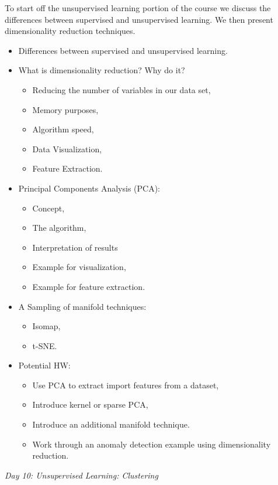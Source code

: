 \documentclass[12pt]{article}
\begin{document}
	\noindent
	To start off the unsupervised learning portion of the course we discuss the differences between supervised and unsupervised learning. We then present dimensionality reduction techniques.
	\begin{itemize}
		\item Differences between supervised and unsupervised learning.
		\item What is dimensionality reduction? Why do it?
			\begin{itemize}
				\item Reducing the number of variables in our data set,
				\item Memory purposes,
				\item Algorithm speed,
				\item Data Visualization,
				\item Feature Extraction.
			\end{itemize}
		\item Principal Components Analysis (PCA):
			\begin{itemize}
				\item Concept,
				\item The algorithm,
				\item Interpretation of results
				\item Example for visualization,
				\item Example for feature extraction.
			\end{itemize}
		\item A Sampling of manifold techniques:
			\begin{itemize}
				\item Isomap,
				\item t-SNE.
			\end{itemize}
		\item Potential HW:
			\begin{itemize}
				\item Use PCA to extract import features from a dataset,
				\item Introduce kernel or sparse PCA,
				\item Introduce an additional manifold technique.
				\item Work through an anomaly detection example using dimensionality reduction.
			\end{itemize}
	\end{itemize}
	
	\vspace{2mm}
	\noindent
	\textit{\large{Day 10: Unsupervised Learning: Clustering}}
	
\end{document}
